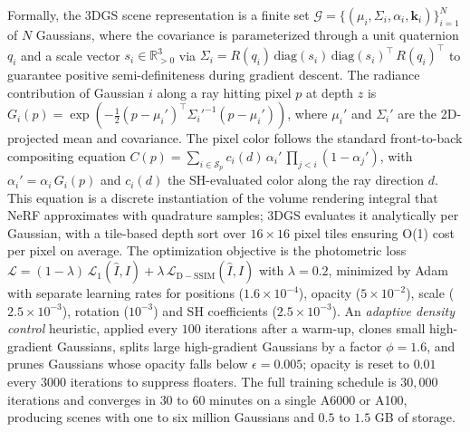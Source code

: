 \documentclass{article}
\begin{document}
Formally, the 3DGS scene representation is a finite set \(\mathcal{G}=\{(\mu_i,\Sigma_i,\alpha_i,\mathbf{k}_i)\}_{i=1}^N\) of \(N\) Gaussians, where the covariance is parameterized through a unit quaternion \(q_i\) and a scale vector \(s_i\in\mathbb{R}^3_{>0}\) via \(\Sigma_i = R(q_i)\,\mathrm{diag}(s_i)\,\mathrm{diag}(s_i)^{\top}\,R(q_i)^{\top}\) to guarantee positive semi-definiteness during gradient descent. The radiance contribution of Gaussian \(i\) along a ray hitting pixel \(p\) at depth \(z\) is \(G_i(p) = \exp(-\tfrac{1}{2}(p-\mu_i')^{\top}{\Sigma_i'}^{-1}(p-\mu_i'))\), where \(\mu_i'\) and \(\Sigma_i'\) are the 2D-projected mean and covariance. The pixel color follows the standard front-to-back compositing equation \(C(p) = \sum_{i\in\mathcal{S}_p} c_i(d)\,\alpha_i'\,\prod_{j<i}(1-\alpha_j')\), with \(\alpha_i'=\alpha_i\,G_i(p)\) and \(c_i(d)\) the SH-evaluated color along the ray direction \(d\). This equation is a discrete instantiation of the volume rendering integral that NeRF approximates with quadrature samples; 3DGS evaluates it analytically per Gaussian, with a tile-based depth sort over \(16\times16\) pixel tiles ensuring O(1) cost per pixel on average. The optimization objective is the photometric loss \(\mathcal{L} = (1-\lambda)\,\mathcal{L}_1(\hat{I},I) + \lambda\,\mathcal{L}_{\mathrm{D-SSIM}}(\hat{I},I)\) with \(\lambda=0.2\), minimized by Adam with separate learning rates for positions (\(1.6\times10^{-4}\)), opacity (\(5\times10^{-2}\)), scale (\(2.5\times10^{-3}\)), rotation (\(10^{-3}\)) and SH coefficients (\(2.5\times10^{-3}\)). An \emph{adaptive density control} heuristic, applied every \(100\) iterations after a warm-up, clones small high-gradient Gaussians, splits large high-gradient Gaussians by a factor \(\phi=1.6\), and prunes Gaussians whose opacity falls below \(\epsilon=0.005\); opacity is reset to \(0.01\) every \(3000\) iterations to suppress floaters. The full training schedule is \(30{,}000\) iterations and converges in \(30\) to \(60\) minutes on a single A6000 or A100, producing scenes with one to six million Gaussians and \(0.5\) to \(1.5\) GB of storage.
\end{document}
